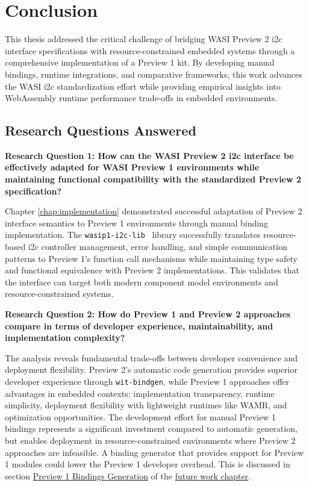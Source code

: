 \chapter*{Conclusion}
\label{chap:conclusion}

This thesis addressed the critical challenge of bridging WASI Preview 2 \acrshort{i2c} interface specifications with resource-constrained embedded systems through a comprehensive implementation of a Preview 1 kit. By developing manual bindings, runtime integrations, and comparative frameworks, this work advances the WASI \acrshort{i2c} standardization effort while providing empirical insights into WebAssembly runtime performance trade-offs in embedded environments.

\section*{Research Questions Answered}
\label{sec:research-questions-answered}

\textbf{Research Question 1: How can the WASI Preview 2 \acrshort{i2c} interface be effectively adapted for WASI Preview 1 environments while maintaining functional compatibility with the standardized Preview 2 specification?}

Chapter \ref{chap:implementation} demonstrated successful adaptation of Preview 2 interface semantics to Preview 1 environments through manual binding implementation. The \texttt{wasip1-i2c-lib}~\cite{p1_lib} library successfully translates resource-based \acrshort{i2c} controller management, error handling, and simple communication patterns to Preview 1's function call mechanisms while maintaining type safety and functional equivalence with Preview 2 implementations. This validates that the interface can target both modern component model environments and resource-constrained systems.

\textbf{Research Question 2: How do Preview 1 and Preview 2 approaches compare in terms of developer experience, maintainability, and implementation complexity?}

The analysis reveals fundamental trade-offs between developer convenience and deployment flexibility. Preview 2's automatic code generation provides superior developer experience through \texttt{wit-bindgen}, while Preview 1 approaches offer advantages in embedded contexts: implementation transparency, runtime simplicity, deployment flexibility with lightweight runtimes like WAMR, and optimization opportunities. The development effort for manual Preview 1 bindings represents a significant investment compared to automatic generation, but enables deployment in resource-constrained environments where Preview 2 approaches are infeasible. A binding generator that provides support for Preview 1 modules could lower the Preview 1 developer overhead. This is discussed in section \hyperref[sec:fw-p1-bindgen]{Preview 1 Bindings Generation} of the \hyperref[chap:future-work]{future work chapter}.

